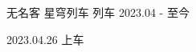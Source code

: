 

\begin{cventries}

  \cventry
    {无名客} %
    {星穹列车} %
    {列车} %
    {2023.04 - 至今} %
    {
      \begin{cvitems}
      \item 2023.04.26 上车
      \end{cvitems}
    }

\end{cventries}
